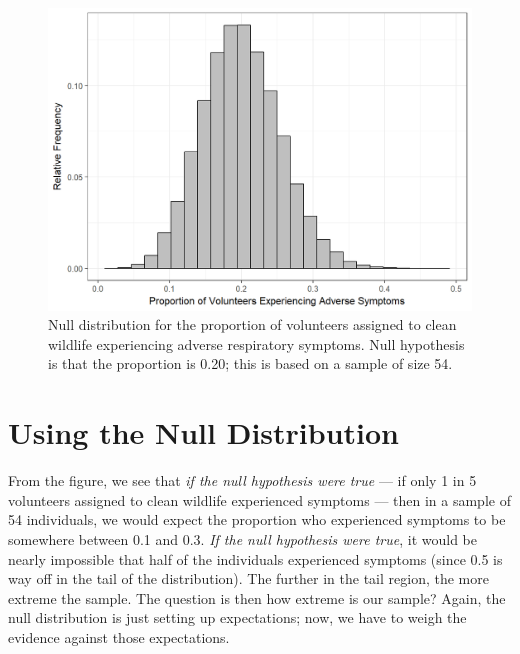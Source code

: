 \documentclass[]{book}
\theoremstyle{definition}
\theoremstyle{definition}
\theoremstyle{definition}
\theoremstyle{remark}
\begin{document}
\begin{figure}

{\centering \includegraphics[width=0.8\linewidth]{./Images/nulldistns-deepwater-null-1} 

}

\caption{Null distribution for the proportion of volunteers assigned to clean wildlife experiencing adverse respiratory symptoms.  Null hypothesis is that the proportion is 0.20; this is based on a sample of size 54.}\label{fig:nulldistns-deepwater-null}
\end{figure}

\section{Using the Null Distribution}\label{using-the-null-distribution}

From the figure, we see that \emph{if the null hypothesis were true} ---
if only 1 in 5 volunteers assigned to clean wildlife experienced
symptoms --- then in a sample of 54 individuals, we would expect the
proportion who experienced symptoms to be somewhere between 0.1 and 0.3.
\emph{If the null hypothesis were true}, it would be nearly impossible
that half of the individuals experienced symptoms (since 0.5 is way off
in the tail of the distribution). The further in the tail region, the
more extreme the sample. The question is then how extreme is our sample?
Again, the null distribution is just setting up expectations; now, we
have to weigh the evidence against those expectations.
\end{document}
